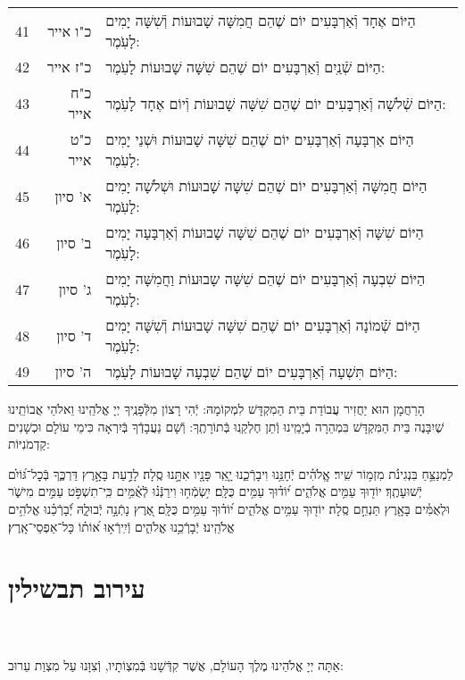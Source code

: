 \documentclass[twoside, openany, parskip=half, 11pt]{book}
\begin{document}
\begin{scriptsize}
\begin{longtable}{ l | r | p{} }
41 & כ"ו אייר & הַיּוֹם אֶחָד וְֿאַרְבָּעִים יוֹם שֶׁהֵם חֲמִשָּׁה שָׁבוּעוֹת וְֿשִׁשָּׁה יָמִים לָעֹֽמֶר: \\
42 & כ"ז אייר & הַיּוֹם שְֿׁנַֽיִם וְֿאַרְבָּעִים יוֹם שֶׁהֵם שִׁשָּׁה שָׁבוּעוֹת לָעֹֽמֶר: \\
43 & כ"ח אייר & הַיּוֹם שְֿׁלֹשָׁה וְֿאַרְבָּעִים יוֹם שֶׁהֵם שִׁשָּׁה שָׁבוּעוֹת וְֿיוֹם אֶחָד לָעֹֽמֶר: \\
44 & כ"ט אייר & הַיּוֹם אַרְבָּעָה וְֿאַרְבָּעִים יוֹם שֶׁהֵם שִׁשָּׁה שָׁבוּעוֹת וּשְׁנֵי יָמִים לָעֹֽמֶר: \\
45 & א' סיון & הַיּוֹם חֲמִשָּׁה וְֿאַרְבָּעִים יוֹם שֶׁהֵם שִׁשָּׁה שָׁבוּעוֹת וּשְׁלֹשָׁה יָמִים לָעֹֽמֶר: \\
46 & ב' סיון & הַיּוֹם שִׁשָּׁה וְֿאַרְבָּעִים יוֹם שֶׁהֵם שִׁשָּׁה שָׁבוּעוֹת וְֿאַרְבָּעָה יָמִים לָעֹֽמֶר: \\
47 & ג' סיון & הַיּוֹם שִׁבְעָה וְֿאַרְבָּעִים יוֹם שֶׁהֵם שִׁשָּׁה שָבוּעוֹת וַחֲמִשָּׁה יָמִים לָעֹֽמֶר: \\
48 & ד' סיון & הַיּוֹם שְֿׁמוֹנָה וְֿאַרְבָּעִים יוֹם שֶׁהֵם שִׁשָּׁה שָׁבוּעוֹת וְֿשִׁשָּׁה יָמִים לָעֹֽמֶר: \\
49 & ה' סיון & הַיּוֹם תִּשְׁעָה וְֿאַרְבָּעִים יוֹם שֶׁהֵם שִׁבְעָה שָׁבוּעוֹת לָעֹֽמֶר:
\end{longtable}
\end{scriptsize}



הָרַחֲמָן הוּא יַחֲזִיר עֲבוֹדַת בֵּית הַמִקְדָּשׁ לִמְקוֹמָהּ:
יְֿהִי רָצוֹן מִלְּֿפָנֶֽיךָ יְיָ אֱלֹהֵֽינוּ וֵאלֹהֵי אֲבוֹתֵֽינוּ שֶׁיִבָּנֶה בֵּית הַמִּקְדָּשׁ בִּמְהֵרָה בְֿיָמֵֽינוּ וְֿתֵן חֶלְקֵֽנוּ בְּֿתוֹרָתֶֽךָ: וְֿשָׁם נַעֲבָדְֿךָ בְּֿיִרְאָה כִּימֵי עוֹלָם וּכְשָׁנִים קַדְמֹנִיּוֹת:


לַמְנַצֵּ֥חַ בִּנְגִינֹ֗ת מִזְמ֥וֹר שִֽׁיר׃ אֱֽלֹהִ֗ים יְֿחָנֵּ֥נוּ וִיבָרְֿכֵ֑נוּ יָ֤אֵֽר פָּנָ֖יו אִתָּ֣נוּ סֶֽלָה׃ לָדַ֣עַת בָּאָ֣רֶץ דַּרְכֶּ֑ךָ בְּֿכׇל־גּ֝וֹיִ֗ם יְֿשׁוּעָתֶֽךָ׃ יוֹד֖וּךָ עַמִּ֥ים אֱלֹהִ֑ים י֝וֹד֗וּךָ עַמִּ֥ים כֻּלָּֽם׃ יִ֥שְׂמְֿח֥וּ וִירַנְּֿנ֗וּ לְֿאֻ֫מִּ֥ים כִּֽי־תִשְׁפֹּ֣ט עַמִּ֣ים מִישֹׁ֑ר וּלְאֻמִּ֓ים בָּאָ֖רֶץ תַּנְחֵ֣ם סֶֽלָה׃ יוֹד֖וּךָ עַמִּ֥ים אֱלֹהִ֑ים י֝וֹד֗וּךָ עַמִּ֥ים כֻּלָּֽם׃ אֶ֭רֶץ נָתְֿנָ֣ה יְֿבוּלָ֑הּ יְֿ֝בָרְֿכֵ֗נוּ אֱלֹהִ֥ים
אֱלֹהֵֽינוּ׃ יְֿבָרְֿכֵ֥נוּ אֱלֹהִ֑ים וְֿיִֽירְֿא֥וּ א֝וֹת֗וֹ כָּל־אַפְסֵי־אָֽרֶץ׃

\chapter[עירוב תבשילין]{ עירוב תבשילין }

\\
\\
אַתָּה יְיָ אֱלֹהֵינוּ מֶלֶךְ הָעוֹלָם, אֲשֶׁר קִדְּֿשָׁנוּ בְּֿמִצְוֹתָיו, וְֿצִוָּנוּ עַל מִצְוַת עֵרוּב:
\end{document}
